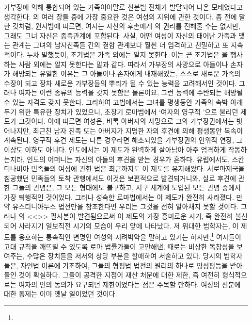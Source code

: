 가부장에 의해 통합되어 있는 가족이야말로
신분법 전체가 발달되어 나온 모태였다고 생각한다.
의 여러 장들 중에
가장 중요한 것은 여성의 지위에 관한 것이다.
좀 전에 말한 것처럼,
원시법에 따르면,
여자는 자신의 후손에게 의 권리를 전해줄 수는 없지만,
그래도 그녀 자신은 종족관계에 포함된다.
사실, 어떤 여성이 자신의 태어난 가족과 맺는 관계는
그녀의 남자친족들 간의 결합 관계보다
훨씬 더 엄격하고 친밀하고 또 지속적이다.
누차 말했듯이,
초기법은 가족 외에는 알지 못한다.
이는 곧 초기법은 을 행사하는 사람 외에는 알지 못한다는 말과 같다.
따라서 가부장의 사망으로 아들이나 손자가 해방되는 유일한 이유는
그 아들이나 손자에게 내재해있는,
스스로 새로운 가족의 수장이 되고
장차 새로운 가부장들의 뿌리가 될 수 있는
능력을 고려해서인 것이다.
그러나 여자는 이런 종류의 능력을 갖지 못함은 물론이요,
그런 능력에 수반되는 해방될 수 있는 자격도 갖지 못한다.
그리하여 고법에서는
그녀를 평생동안 가족의 속박 아래 두기 위한 특유한 장치가 있었으니,
초창기 로마법에서
`여자의 영구적 '으로 불리던 제도가 그것이다.
이에 따르면 여성은,
비록 아버지의 사망으로 그의 가부장권에서는 벗어나지만,
최근친 남자 친족 또는 아버지가 지명한 자의 후견에 의해
평생동안
복속이
계속된다.
영구적 후견 제도는
다른 경우라면 해소되었을
가부장권의 인위적 연장, 그 이상도 이하도 아니다.
인도에서는 이 제도가 완벽하게 살아남아
아주 엄격하게 작동하는지라, 인도의 어머니는
자신의 아들의 후견을 받는 경우가 흔하다.
유럽에서도,
스칸디나비아 민족들의
여성에 관한
법은 최근까지도 이 제도를 유지해왔다.
서로마제국을 침공했던 민족들의 토착 관행에서도 이것은 보편적으로
발견되거니와, 실로 후견에 관한 그들의 관념은, 그 모든 형태에도 불구하고,
서구 세계에 도입된 모든 관념 중에서 가장 퇴행적인 것이었다.
그러나 성숙한 로마법에서는 이 제도가 완전히 사라졌다.
만약 유스티니아누스 법전만을 참조한다면
우리는 그것을 전혀 알아채지 못할 것이다.
그러나 의 <<>> 필사본이 발견됨으로써
이 제도의 가장 흥미로운 시기,
즉 완전히 불신되어 사라지기 일보직전 시기의
모습이 우리 앞에 나타났다.
저 위대한 법학자는,
이 제도를 옹호하는 통속적인 변명인
여성의 지려박약을 말하고 있기는 하지만,\footnote{%
  }
여자들이
고대 규칙을 깨뜨릴 수 있도록
로마 법률가들이 고안해낸, 때로는 비상한 독창성을 보여주는,
수많은 장치들을
저서의 상당 부분을 할애하여
서술하고 있다.
당시의 법학자들은,
자연법 이론에 기초하여,
그들의 형평법 법전의 원리의 하나로
양성평등을
받아들인 것이 확실하다.
그들이 공격한 지점이 재산 처분에 대한 제한,
즉 여전히 형식적으로는 여자의 인의 동의가 요구되던
제한이었다는 점은 주목할 만하다.
여성의 신분에 대한 통제는 이미 옛날 일이었던 것이다.

